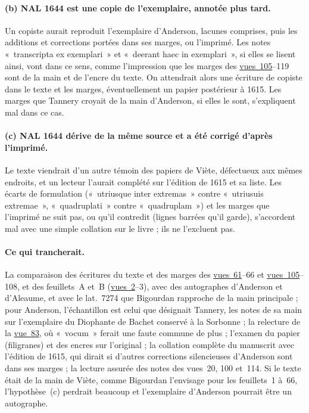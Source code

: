 \documentclass[11pt,a4paper]{article}
\theoremstyle{remark}
\newcommand{\vue}[1]{\href{https://gallica.bnf.fr/ark:/12148/btv1b10033620q/f#1.item}{vue~#1}}
\newcommand{\vues}[2]{\href{https://gallica.bnf.fr/ark:/12148/btv1b10033620q/f#1.item}{vues~#1}--#2}
\begin{document}
\paragraph{(b) NAL 1644 est une copie de l'exemplaire, annotée plus tard.}
Un copiste aurait reproduit l'exemplaire d'Anderson, lacunes comprises, puis
les additions et corrections portées dans ses marges, ou l'imprimé. Les
notes «~transcripta ex exemplari~» et «~deerant haec in exemplari~», si
elles se lisent ainsi, vont dans ce sens, comme l'impression que les marges
des \vues{105}{119} sont de la main et de l'encre du texte. On attendrait
alors une écriture de copiste dans le texte et les marges, éventuellement
un papier postérieur à 1615. Les marges que Tannery croyait de la main
d'Anderson, si elles le sont, s'expliquent mal dans ce cas.

\paragraph{(c) NAL 1644 dérive de la même source et a été corrigé d'après l'imprimé.}
Le texte viendrait d'un autre témoin des papiers de Viète, défectueux aux
mêmes endroits, et un lecteur l'aurait complété sur l'édition de 1615 et sa
liste. Les écarts de formulation («~utriusque inter extremas~» contre
«~utriusuis extremae~», «~quadruplati~» contre «~quadruplam~») et les marges
que l'imprimé ne suit pas, ou qu'il contredit (lignes barrées qu'il garde),
s'accordent mal avec une simple collation sur le livre ; ils ne
l'excluent pas.

\paragraph{Ce qui trancherait.}
La comparaison des écritures du texte et des marges des \vues{61}{66} et
\vues{105}{108}, et des feuillets~A et~B (\vues{2}{3}), avec des
autographes d'Anderson et d'Aleaume, et avec le lat.~7274 que Bigourdan
rapproche de la main principale ; pour Anderson, l'échantillon est celui
que désignait Tannery, les notes de sa main sur l'exemplaire du Diophante
de Bachet conservé à la Sorbonne ; la relecture de la \vue{83}, où
«~vocum~» ferait une faute commune de plus ; l'examen du papier
(filigranes) et des encres sur l'original ; la collation complète du
manuscrit avec l'édition de 1615, qui dirait si d'autres corrections
silencieuses d'Anderson sont dans ses marges ; la lecture assurée des notes
des vues~20, 100 et~114. Si le texte était de la main de Viète, comme
Bigourdan l'envisage pour les feuillets~1 à~66, l'hypothèse~(c) perdrait
beaucoup et l'exemplaire d'Anderson pourrait être un autographe.
\end{document}

